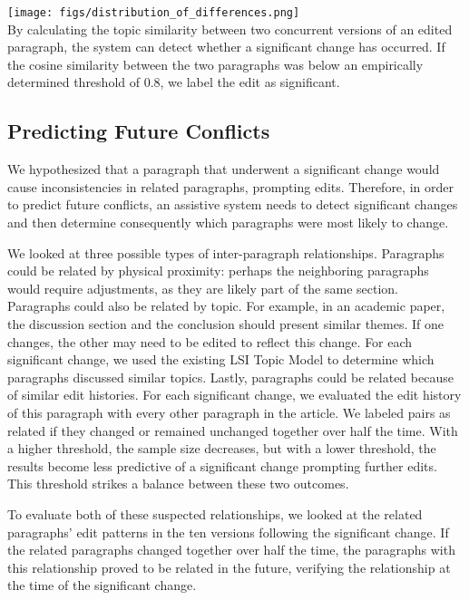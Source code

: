\texttt{[image: figs/distribution\_of\_differences.png]}\\

By calculating the topic similarity between two concurrent versions of
an edited paragraph, the system can detect whether a significant change
has occurred. If the cosine similarity between the two paragraphs was
below an empirically determined threshold of 0.8, we label the edit as
significant.

\subsection{Predicting Future
Conflicts}\label{predicting-future-conflicts}

We hypothesized that a paragraph that underwent a significant change
would cause inconsistencies in related paragraphs, prompting edits.
Therefore, in order to predict future conflicts, an assistive system
needs to detect significant changes and then determine consequently
which paragraphs were most likely to change.

We looked at three possible types of inter-paragraph relationships.
Paragraphs could be related by physical proximity: perhaps the
neighboring paragraphs would require adjustments, as they are likely
part of the same section. Paragraphs could also be related by topic. For
example, in an academic paper, the discussion section and the conclusion
should present similar themes. If one changes, the other may need to be
edited to reflect this change. For each significant change, we used the
existing LSI Topic Model to determine which paragraphs discussed similar
topics. Lastly, paragraphs could be related because of similar edit
histories. For each significant change, we evaluated the edit history of
this paragraph with every other paragraph in the article. We labeled
pairs as related if they changed or remained unchanged together over
half the time. With a higher threshold, the sample size decreases, but
with a lower threshold, the results become less predictive of a
significant change prompting further edits. This threshold strikes a
balance between these two outcomes.

To evaluate both of these suspected relationships, we looked at the
related paragraphs' edit patterns in the ten versions following the
significant change. If the related paragraphs changed together over half
the time, the paragraphs with this relationship proved to be related in
the future, verifying the relationship at the time of the significant
change.


